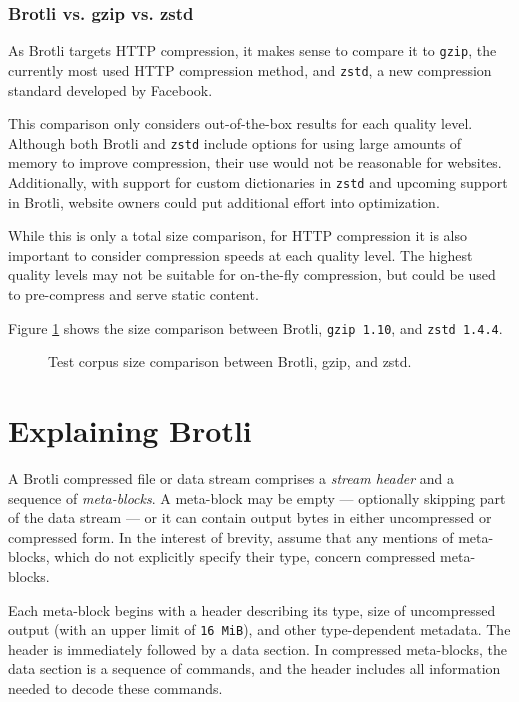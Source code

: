 \documentclass[english,master,dept460,male,cpp,cpdeclaration]{diploma}
\newcommand{\tikzfigure}[1]{
	\tikzsetnextfilename{#1}%
}
\begin{document}
		\subsubsection{Brotli vs. gzip vs. zstd}
		
		As Brotli targets HTTP compression, it makes sense to compare it to \verb|gzip|, the currently most used HTTP compression method, and \verb|zstd|, a new compression standard developed by Facebook.
		
		This comparison only considers out-of-the-box results for each quality level. Although both Brotli and \texttt{zstd} include options for using large amounts of memory to improve compression, their use would not be reasonable for websites. Additionally, with support for custom dictionaries in \verb|zstd| and upcoming support in Brotli, website owners could put additional effort into optimization.
		
		While this is only a total size comparison, for HTTP compression it is also important to consider compression speeds at each quality level. The highest quality levels may not be suitable for on-the-fly compression, but could be used to pre-compress and serve static content.
		
		Figure \ref{fig:test-corpus-comparison} shows the size comparison between Brotli, \verb|gzip 1.10|, and \verb|zstd 1.4.4|.
		
		\begin{figure}[H]
			\tikzfigure{test-corpus-comparison}
			\caption{Test corpus size comparison between Brotli, gzip, and zstd.}
			\label{fig:test-corpus-comparison}
		\end{figure}

\section{Explaining Brotli}
\label{sec:explaining-brotli}

A Brotli compressed file or data stream comprises a \emph{stream header} and a sequence of \emph{meta-blocks}. A meta-block may be empty --- optionally skipping part of the data stream --- or it can contain output bytes in either uncompressed or compressed form. In the interest of brevity, assume that any mentions of meta-blocks, which do not explicitly specify their type, concern compressed meta-blocks.

Each meta-block begins with a header describing its type, size of uncompressed output (with an upper limit of \verb|16 MiB|), and other type-dependent metadata. The header is immediately followed by a data section. In compressed meta-blocks, the data section is a sequence of commands, and the header includes all information needed to decode these commands.
\end{document}
